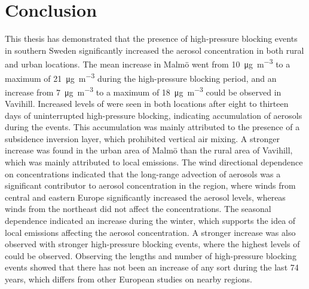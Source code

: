\section{Conclusion}
This thesis has demonstrated that the presence of high-pressure blocking events in southern Sweden significantly increased the aerosol concentration in both rural and urban locations. The \PM mean increase in Malmö went from \SI{10}{\micro\gram\per\meter\cubed} to a maximum of \SI{21}{\micro\gram\per\meter\cubed} during the high-pressure blocking period, and an increase from \SI{7}{\micro\gram\per\meter\cubed} to a maximum of \SI{18}{\micro\gram\per\meter\cubed} could be observed in Vavihill. Increased levels of \PM were seen in both locations after eight to thirteen days of uninterrupted high-pressure blocking, indicating accumulation of aerosols during the events. This accumulation was mainly attributed to the presence of a subsidence inversion layer, which prohibited vertical air mixing. A stronger increase was found in the urban area of Malmö than the rural area of Vavihill, which was mainly attributed to local emissions. The wind directional dependence on \PM concentrations indicated that the long-range advection of aerosols was a significant contributor to aerosol concentration in the region, where winds from central and eastern Europe significantly increased the aerosol levels, whereas winds from the northeast did not affect the concentrations. The seasonal dependence indicated an increase during the winter, which supports the idea of local emissions affecting the aerosol concentration. A stronger increase was also observed with stronger high-pressure blocking events, where the highest levels of \PM could be observed. Observing the lengths and number of high-pressure blocking events showed that there has not been an increase of any sort during the last 74 years, which differs from other European studies on nearby regions.


